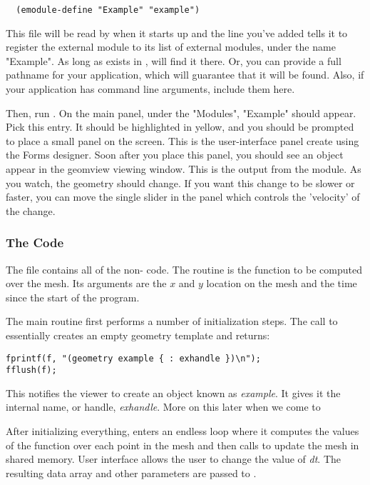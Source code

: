 \begin{verbatim}
  (emodule-define "Example" "example")
\end{verbatim}

This file will be read by  when it starts
up and the line you've added tells it to register the
external module  to its list of external modules,
under the name "Example".  As long as  exists
in ,  will find it there.
Or, you can provide a full pathname for your application, which
will guarantee that it will be found.  Also, if your application
has command line arguments, include them here.

Then, run .  On the main panel, under the
"Modules",  "Example" should appear.  Pick this entry.  It 
should be highlighted in yellow, and  you should be prompted to
place a small panel on the screen.  This is the user-interface panel
create using the Forms designer.  Soon after you place this panel,
you should see an object appear in the geomview viewing window.
This is the output from the  module.  As you
watch, the geometry should change.  If you want this change to be
slower or faster, you can move the single slider in the panel
which controls the 'velocity' of the change.  

\subsubsection{The  Code}

The file  contains all of the non-{\OOGL} code.  The
routine  is the function to be computed over the
mesh.  Its arguments are the $x$ and $y$ location on the mesh and
the time since the start of the program.

The main routine first performs a number of initialization steps.
The call to  essentially creates an empty 
geometry template and returns:

\begin{verbatim}
fprintf(f, "(geometry example { : exhandle })\n");
fflush(f);
\end{verbatim}

This notifies the viewer to create an object known as 
{\em example}.  It gives it the internal name, or handle, 
{\em exhandle}. 
More on this later when we come to 

After initializing everything,  enters an endless
loop where it computes the values of the function over each point in
the mesh and then calls  to update the {\OOGL}
mesh in shared memory.  User interface allows the user to change
the value of {\em dt}. The resulting data array and other parameters
are passed to . 

